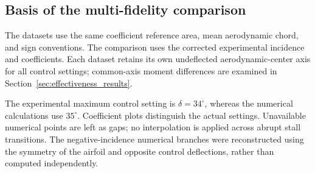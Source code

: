 \documentclass[journal ]{new-aiaa}
\begin{document}

\subsection{Basis of the multi-fidelity comparison}
\label{sec:comparison_basis}

The datasets use the same coefficient reference area, mean aerodynamic chord, and sign conventions.
The comparison uses the corrected experimental incidence and coefficients. Each dataset retains its own undeflected aerodynamic-center axis for all control settings; common-axis moment differences are examined in Section~\ref{sec:effectiveness_results}.

The experimental maximum control setting is \(\delta=34^\circ\), whereas the numerical calculations use \(35^\circ\).
Coefficient plots distinguish the actual settings.
Unavailable numerical points are left as gaps; no interpolation is applied across abrupt stall transitions.
The negative-incidence numerical branches were reconstructed using the symmetry of the airfoil and opposite control deflections, rather than computed independently.
\end{document}
